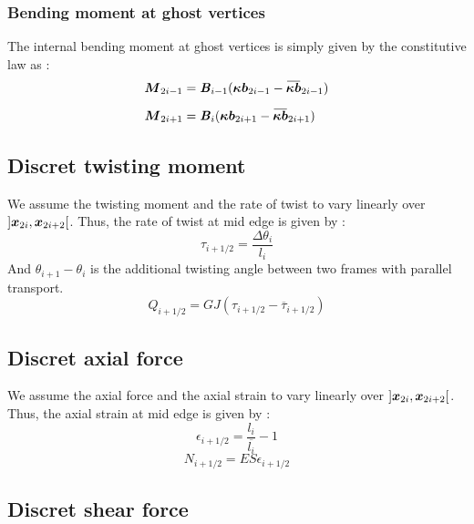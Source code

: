 \subsubsection{Bending moment at ghost vertices}

The internal bending moment at ghost vertices is simply given by the constitutive law as :
\begin{subequations}
	\begin{align}
		\vect{M}_{2i-1} &=  \mat{B}_{i-1}(\vect{\kappa b}_{2i-1} - \overbar{\vect{\kappa b}}_{2i-1})
		\\[0.5em]
		\vect{M}_{2i+1} &=  \mat{B}_{i}(\vect{\kappa b}_{2i+1} - \overbar{\vect{\kappa b}}_{2i+1})
	\end{align}
\end{subequations}

\subsection{Discret twisting moment}

We assume the twisting moment and the rate of twist to vary linearly over $]\boldsymbol{x}_{2i},  \boldsymbol{x}_{2i+2}[$.
Thus, the rate of twist at mid edge is given by :
\begin{equation}
	\tau_{i+1/2} = \frac{\Delta\theta_{i}}{l_i}
\end{equation}
And $\theta_{i+1} - \theta_{i}$ is the additional twisting angle between two frames with parallel transport.
\begin{equation}
	Q_{i+1/2} =  GJ(\tau_{i+1/2} - \overbar{\tau}_{i+1/2})
\end{equation}

\subsection{Discret axial force}

We assume the axial force and the axial strain to vary linearly over $]\boldsymbol{x}_{2i},  \boldsymbol{x}_{2i+2}[$.
Thus, the axial strain at mid edge is given by :
\begin{equation}
	\epsilon_{i+1/2} = \frac{l_{i}}{\overbar{l_i}} - 1
\end{equation}
\begin{equation}
	N_{i+1/2} =  ES\epsilon_{i+1/2}
\end{equation}

\subsection{Discret shear force}

